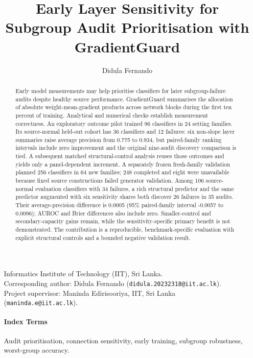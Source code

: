 \title{Early Layer Sensitivity for Subgroup Audit Prioritisation with GradientGuard}
\author{Didula Fernando}
\date{}
\maketitle
\noindent Informatics Institute of Technology (IIT), Sri Lanka.\\
Corresponding author: Didula Fernando (\texttt{didula.20232318@iit.ac.lk}).\\
Project supervisor: Maninda Edirisooriya, IIT, Sri Lanka (\texttt{maninda.e@iit.ac.lk}).
\begin{abstract}
Early model measurements may help prioritise classifiers for later subgroup-failure audits despite healthy source performance. GradientGuard summarises the allocation of absolute weight-mean-gradient products across network blocks during the first ten percent of training. Analytical and numerical checks establish measurement correctness. An exploratory outcome pilot trained 96 classifiers in 24 setting families. Its source-normal held-out cohort has 36 classifiers and 12 failures: six non-slope layer summaries raise average precision from 0.775 to 0.934, but paired-family ranking intervals include zero improvement and the original nine-audit discovery comparison is tied. A subsequent matched structural-control analysis reuses those outcomes and yields only a panel-dependent increment. A separately frozen fresh-family validation planned 256 classifiers in 64 new families; 248 completed and eight were unavailable because fixed source constructions failed generator validation. Among 106 source-normal evaluation classifiers with 34 failures, a rich structural predictor and the same predictor augmented with six sensitivity shares both discover 26 failures in 35 audits. Their average-precision difference is 0.0005 (95\% paired-family interval -0.0057 to 0.0096); AUROC and Brier differences also include zero. Smaller-control and secondary-capacity gains remain, while the sensitivity-specific primary benefit is not demonstrated. The contribution is a reproducible, benchmark-specific evaluation with explicit structural controls and a bounded negative validation result.
\end{abstract}
\paragraph{Index Terms}
Audit prioritisation, connection sensitivity, early training, subgroup robustness, worst-group accuracy.



